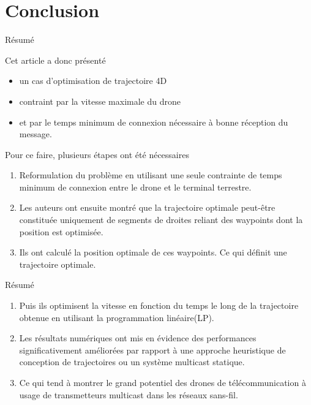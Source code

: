 \section{Conclusion}


\begin{frame} {Résumé}

Cet article a donc présenté 
\begin{itemize}
	\item un cas d'optimisation de trajectoire 4D
	\item contraint par la vitesse maximale du drone
	\item et par le temps minimum de connexion nécessaire à bonne réception du message. 
\end{itemize}


\end{frame}


\begin{frame} {}

Pour ce faire, plusieurs étapes ont été nécessaires

\begin{enumerate}
	\item Reformulation du problème en utilisant une seule contrainte
	de temps minimum de connexion entre le drone et le terminal terrestre.\pause
	
	\item Les auteurs ont ensuite montré que la trajectoire optimale
	peut-être constituée uniquement de segments de droites reliant des
	waypoints dont la position est optimisée.\pause
	\item Ils ont calculé la position optimale de ces waypoints.
	Ce qui définit une trajectoire optimale. \pause 
	\asuivre
	
\end{enumerate}
\end{frame}	
	
\begin{frame} {Résumé}



\begin{enumerate}	
	
	 \suite
	\item Puis ils optimisent la vitesse en fonction du temps le long de la trajectoire obtenue
	en utilisant la programmation linéaire(LP).\pause
	\item Les résultats numériques ont mis en évidence des performances significativement améliorées
	 par rapport à une approche heuristique de conception de trajectoires ou un système multicast statique.\pause
	\item Ce qui tend à montrer le grand potentiel des drones de 
	télécommunication à usage de transmetteurs multicast dans les réseaux sans-fil.
	 
\end{enumerate}
\end{frame}



